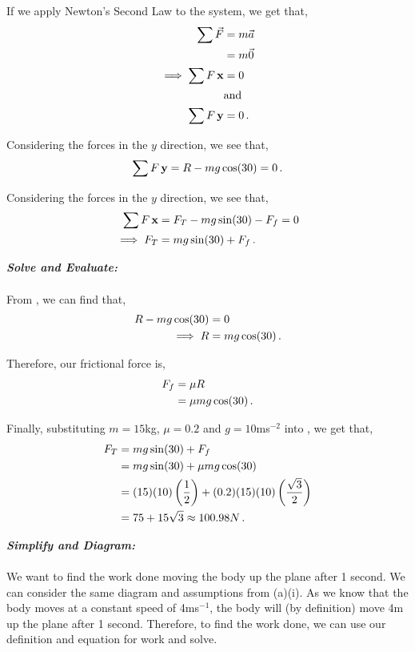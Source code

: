 \begin{subquestions}
\begin{subsubquestions}
If we apply Newton's Second Law to the system, we get that,
\begin{align}
	\sum \vec{F} & = m\vec{a} \nonumber \\
	& = m\vec{0} \nonumber \\
	\implies \sum F\,\mathbf{x} & = 0  \\
	& \text {and} \nonumber \\
	\sum F\,\mathbf{y} & = 0 \,.
\end{align}

Considering the forces in the $y$ direction, we see that,
\begin{equation}
	\sum F\,\mathbf{y} = R - mg\cos(30) = 0 \,. \label{2016:q6:REq1}
\end{equation}

Considering the forces in the $y$ direction, we see that,
\begin{align}
	\sum F\,\mathbf{x} & = F_T - mg\sin(30) -F_f = 0 \nonumber \\
	            \implies F_T & = mg\sin(30) + F_f \,. \label{2016:q6:EqnAi}
\end{align}




\textbf{\textit{Solve and Evaluate:}} \\ \\
From , we can find that,
\begin{align}
	R - mg\cos(30) & = 0 \nonumber \\
	\implies R & = mg\cos(30) \,.
\end{align}

Therefore, our frictional force is,
\begin{align}
	F_f & = \mu R \nonumber \\
        & = \mu mg\cos(30) \,.
\end{align}

Finally, substituting $m=15$kg, $\mu=0.2$ and $g=10$ms$^{-2}$ into , we get that,
\begin{align}
	F_T & = mg\sin(30) + F_f \nonumber \\
	    & = mg\sin(30) + \mu mg\cos(30) \nonumber \\
	    & = (15)(10)\left(\frac{1}{2}\right) + (0.2)(15)(10)\left(\frac{\sqrt{3}}{2}\right) \nonumber \\
	    & = 75 + 15\sqrt{3} \approx  100.98 N \,.
\end{align}


\subsubquestion
\textbf{\textit{Simplify and Diagram:}} \\ \\
We want to find the work done moving the body up the plane after 1 second. We can consider the same diagram and assumptions from (a)(i). As we know that the body moves at a constant speed of 4ms$^{-1}$, the body will (by definition) move 4m up the plane after 1 second. Therefore, to find the work done, we can use our definition and equation for work and solve.





\end{subsubquestions}
\end{subquestions}
